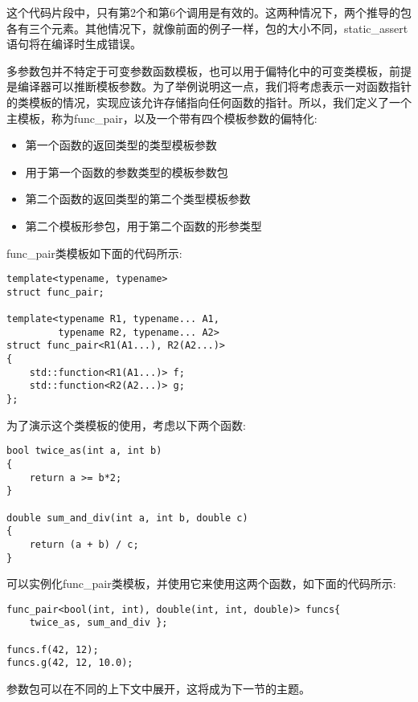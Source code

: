 这个代码片段中，只有第2个和第6个调用是有效的。这两种情况下，两个推导的包各有三个元素。其他情况下，就像前面的例子一样，包的大小不同，static\_assert语句将在编译时生成错误。

多参数包并不特定于可变参数函数模板，也可以用于偏特化中的可变类模板，前提是编译器可以推断模板参数。为了举例说明这一点，我们将考虑表示一对函数指针的类模板的情况，实现应该允许存储指向任何函数的指针。所以，我们定义了一个主模板，称为func\_pair，以及一个带有四个模板参数的偏特化:

\begin{itemize}
\item
第一个函数的返回类型的类型模板参数

\item
用于第一个函数的参数类型的模板参数包

\item
第二个函数的返回类型的第二个类型模板参数

\item
第二个模板形参包，用于第二个函数的形参类型
\end{itemize}

func\_pair类模板如下面的代码所示:

\begin{lstlisting}[style=styleCXX]
template<typename, typename>
struct func_pair;

template<typename R1, typename... A1,
         typename R2, typename... A2>
struct func_pair<R1(A1...), R2(A2...)>
{
	std::function<R1(A1...)> f;
	std::function<R2(A2...)> g;
};
\end{lstlisting}

为了演示这个类模板的使用，考虑以下两个函数:

\begin{lstlisting}[style=styleCXX]
bool twice_as(int a, int b)
{
	return a >= b*2;
}

double sum_and_div(int a, int b, double c)
{
	return (a + b) / c;
}
\end{lstlisting}

可以实例化func\_pair类模板，并使用它来使用这两个函数，如下面的代码所示:

\begin{lstlisting}[style=styleCXX]
func_pair<bool(int, int), double(int, int, double)> funcs{
	twice_as, sum_and_div };

funcs.f(42, 12);
funcs.g(42, 12, 10.0);
\end{lstlisting}

参数包可以在不同的上下文中展开，这将成为下一节的主题。

